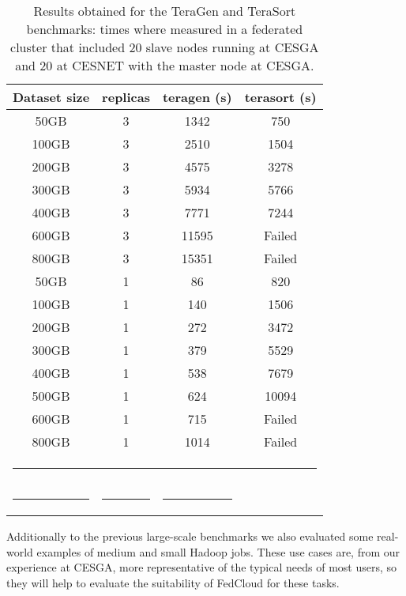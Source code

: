 \begin{table}[h!]
\caption{Results obtained for the TeraGen and TeraSort benchmarks: times where measured in a federated cluster that included 20 slave nodes running at CESGA and 20 at CESNET with the master node at CESGA.  }
\label{table:terasort}
%
\vspace{-0.5em}
%
\begin{center}
\begin{tabular}{cccc}
\toprule
Dataset size		& replicas & teragen (s)		& terasort (s) 	  \\
\midrule
50GB  & 3 & 1342 & 750 \\
100GB & 3 & 2510 & 1504 \\
200GB & 3 & 4575 & 3278 \\
300GB & 3 & 5934 & 5766 \\
400GB & 3 & 7771 & 7244 \\
600GB & 3 & 11595 & Failed \\
800GB & 3 & 15351 & Failed \\
50GB & 1 & 86 & 820 \\
100GB & 1 & 140 & 1506 \\
200GB & 1 & 272 & 3472 \\
300GB & 1 & 379 & 5529 \\
400GB & 1 & 538 & 7679 \\
500GB & 1 & 624 & 10094 \\
600GB & 1 & 715 & Failed \\
800GB & 1 & 1014 & Failed \\
%
\bottomrule
\multicolumn{4}{c}{\rule{0.98\textwidth}{0em}}\\
\rule{0.2\textwidth}{0cm} & \rule{0.2\textwidth}{0cm} & \rule{0.2\textwidth}{0cm} &   \\
\end{tabular}
\end{center}
\end{table}


Additionally to the previous large-scale benchmarks we also evaluated some real-world examples of medium and small Hadoop jobs. These use cases are, from our experience at CESGA, more representative of the typical needs of most users, so they will help to evaluate the suitability of FedCloud for these tasks.

